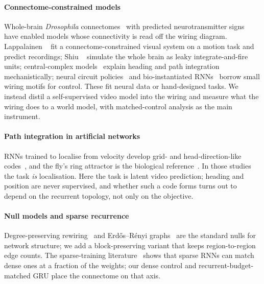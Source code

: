 \paragraph{Connectome-constrained models}
Whole-brain \emph{Drosophila} connectomes~\cite{dorkenwald2024neuronal,schlegel2024whole} with predicted
neurotransmitter signs~\cite{eckstein2024neurotransmitter} have enabled models whose connectivity is read off the wiring
diagram. Lappalainen \etal~\cite{lappalainen2024connectome} fit a connectome-constrained visual system on a motion task
and predict recordings; Shiu \etal~\cite{shiu2024drosophila} simulate the whole brain as leaky integrate-and-fire units;
central-complex models~\cite{hulse2021connectome,stone2017anatomically} explain heading and path integration
mechanistically; neural circuit policies~\cite{lechner2020neural} and bio-instantiated RNNs~\cite{goulas2021bio} borrow
small wiring motifs for control. These fit neural data or hand-designed tasks. We instead distil a self-supervised video
model into the wiring and measure what the wiring does to a world model, with matched-control analysis as the main
instrument.

\paragraph{Path integration in artificial networks}
RNNs trained to localise from velocity develop grid- and head-direction-like
codes~\cite{cueva2018emergence,banino2018vector,sorscher2019unified}, and the fly's ring attractor is the biological
reference~\cite{seelig2015neural,kim2017ring,green2017neural,turnerevans2017angular}. In those studies the task \emph{is}
localisation. Here the task is latent video prediction; heading and position are never supervised, and whether such a
code forms turns out to depend on the recurrent topology, not only on the objective.

\paragraph{Null models and sparse recurrence}
Degree-preserving rewiring~\cite{maslov2002specificity} and Erd\H{o}s--R\'enyi graphs~\cite{erdos1959random} are the
standard nulls for network structure; we add a block-preserving variant that keeps region-to-region edge counts. The
sparse-training literature~\cite{frankle2019lottery,narang2017exploring} shows that sparse RNNs can match dense ones at
a fraction of the weights; our dense control and recurrent-budget-matched GRU place the connectome on that axis.
